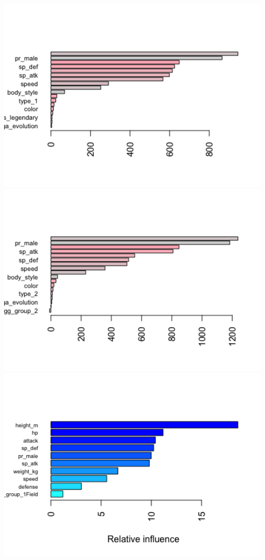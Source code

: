 \documentclass[
]{article}
\begin{document}
\includegraphics[width=6.25in]{./plot/rf_vi}
\includegraphics[width=6.25in]{./plot/bag_vi}
\includegraphics[width=6.25in]{./plot/boost_vi}
\end{document}
